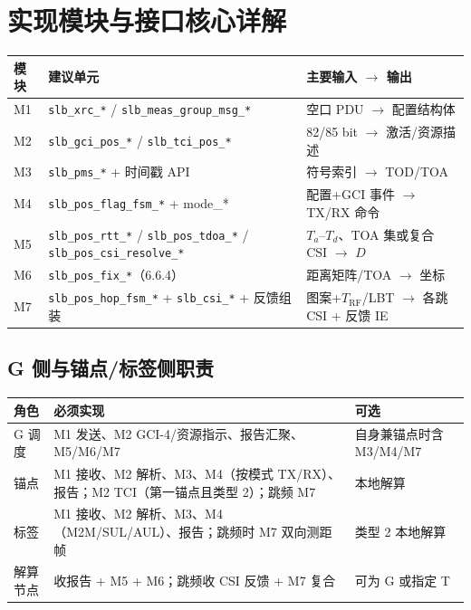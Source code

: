 \documentclass[11pt,a4paper]{ctexart}
\begin{document}
\section{实现模块与接口核心详解}

\begin{table}[h]
\centering
\small
\begin{tabular}{lll}
\toprule
\textbf{模块} & \textbf{建议单元} & \textbf{主要输入 $\rightarrow$ 输出} \\
\midrule
M1 & \texttt{slb\_xrc\_*} / \texttt{slb\_meas\_group\_msg\_*} & 空口 PDU $\rightarrow$ 配置结构体 \\
M2 & \texttt{slb\_gci\_pos\_*} / \texttt{slb\_tci\_pos\_*} & 82/85 bit $\rightarrow$ 激活/资源描述 \\
M3 & \texttt{slb\_pms\_*} + 时间戳 API & 符号索引 $\rightarrow$ TOD/TOA \\
M4 & \texttt{slb\_pos\_flag\_fsm\_*} + mode\_* & 配置+GCI 事件 $\rightarrow$ TX/RX 命令 \\
M5 & \texttt{slb\_pos\_rtt\_*} / \texttt{slb\_pos\_tdoa\_*} / \texttt{slb\_pos\_csi\_resolve\_*} & $T_a$--$T_d$、TOA 集或复合 CSI $\rightarrow$ $D$ \\
M6 & \texttt{slb\_pos\_fix\_*}（6.6.4） & 距离矩阵/TOA $\rightarrow$ 坐标 \\
M7 & \texttt{slb\_pos\_hop\_fsm\_*} + \texttt{slb\_csi\_*} + 反馈组装 & 图案+$T_{\mathrm{RF}}$/LBT $\rightarrow$ 各跳 CSI + 反馈 IE \\
\bottomrule
\end{tabular}
\end{table}

\subsection{G 侧与锚点/标签侧职责}

\begin{table}[h]
\centering
\small
\begin{tabular}{L{2.5cm}L{6cm}L{4.5cm}}
\toprule
\textbf{角色} & \textbf{必须实现} & \textbf{可选} \\
\midrule
G 调度 & M1 发送、M2 GCI-4/资源指示、报告汇聚、M5/M6/M7 & 自身兼锚点时含 M3/M4/M7 \\
锚点 & M1 接收、M2 解析、M3、M4（按模式 TX/RX）、报告；M2 TCI（第一锚点且类型 2）；跳频 M7 & 本地解算 \\
标签 & M1 接收、M2 解析、M3、M4（M2M/SUL/AUL）、报告；跳频时 M7 双向测距帧 & 类型 2 本地解算 \\
解算节点 & 收报告 + M5 + M6；跳频收 CSI 反馈 + M7 复合 & 可为 G 或指定 T \\
\bottomrule
\end{tabular}
\end{table}
\end{document}
